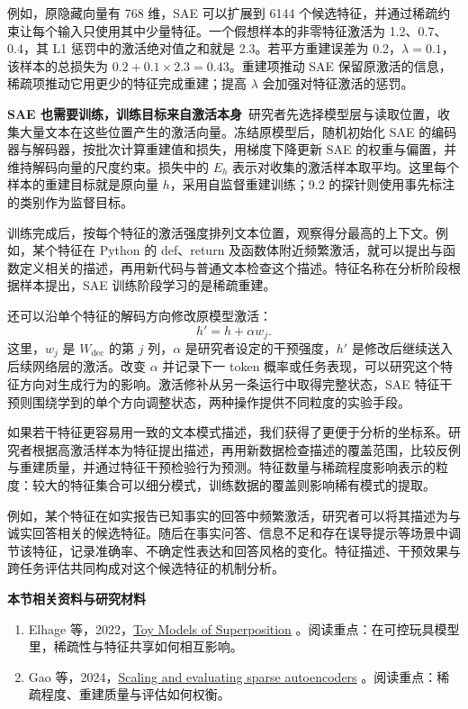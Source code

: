 例如，原隐藏向量有 768 维，SAE 可以扩展到 6144 个候选特征，并通过稀疏约束让每个输入只使用其中少量特征。一个假想样本的非零特征激活为 1.2、0.7、0.4，其 L1 惩罚中的激活绝对值之和就是 2.3。若平方重建误差为 0.2，$\lambda=0.1$，该样本的总损失为 $0.2+0.1\times2.3=0.43$。重建项推动 SAE 保留原激活的信息，稀疏项推动它用更少的特征完成重建；提高 $\lambda$ 会加强对特征激活的惩罚。

\textbf{SAE 也需要训练，训练目标来自激活本身}~研究者先选择模型层与读取位置，收集大量文本在这些位置产生的激活向量。冻结原模型后，随机初始化 SAE 的编码器与解码器，按批次计算重建值和损失，用梯度下降更新 SAE 的权重与偏置，并维持解码向量的尺度约束。损失中的 $E_h$ 表示对收集的激活样本取平均。这里每个样本的重建目标就是原向量 $h$，采用自监督重建训练；9.2 的探针则使用事先标注的类别作为监督目标。

训练完成后，按每个特征的激活强度排列文本位置，观察得分最高的上下文。例如，某个特征在 Python 的 def、return 及函数体附近频繁激活，就可以提出与函数定义相关的描述，再用新代码与普通文本检查这个描述。特征名称在分析阶段根据样本提出，SAE 训练阶段学习的是稀疏重建。

还可以沿单个特征的解码方向修改原模型激活：
\[
h'=h+\alpha w_j.
\]
这里，$w_j$ 是 $W_{\mathrm{dec}}$ 的第 $j$ 列，$\alpha$ 是研究者设定的干预强度，$h'$ 是修改后继续送入后续网络层的激活。改变 $\alpha$ 并记录下一 token 概率或任务表现，可以研究这个特征方向对生成行为的影响。激活修补从另一条运行中取得完整状态，SAE 特征干预则围绕学到的单个方向调整状态，两种操作提供不同粒度的实验手段。

如果若干特征更容易用一致的文本模式描述，我们获得了更便于分析的坐标系。研究者根据高激活样本为特征提出描述，再用新数据检查描述的覆盖范围，比较反例与重建质量，并通过特征干预检验行为预测。特征数量与稀疏程度影响表示的粒度：较大的特征集合可以细分模式，训练数据的覆盖则影响稀有模式的提取。

例如，某个特征在如实报告已知事实的回答中频繁激活，研究者可以将其描述为与诚实回答相关的候选特征。随后在事实问答、信息不足和存在误导提示等场景中调节该特征，记录准确率、不确定性表达和回答风格的变化。特征描述、干预效果与跨任务评估共同构成对这个候选特征的机制分析。

\textbf{本节相关资料与研究材料}
\begin{enumerate}
    \item Elhage 等，2022，\href{https://arxiv.org/abs/2209.10652}{Toy Models of Superposition} 。阅读重点：在可控玩具模型里，稀疏性与特征共享如何相互影响。
    \item Gao 等，2024，\href{https://arxiv.org/abs/2406.04093}{Scaling and evaluating sparse autoencoders} 。阅读重点：稀疏程度、重建质量与评估如何权衡。
\end{enumerate}

